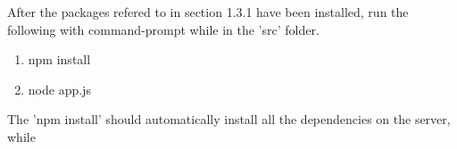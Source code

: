 After the packages refered to in section 1.3.1 have been installed, run the following with command-prompt while in the 'src' folder. 
\begin{enumerate} 
\item npm install 
\item node app.js 
\end{enumerate}

The 'npm install' should automatically install all the dependencies on the server, while 
